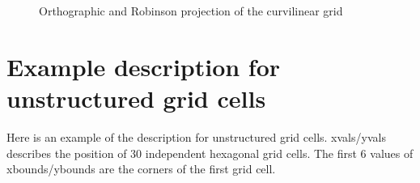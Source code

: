 \begin{figure}[b]
{}
\caption[curvgrid]{Orthographic and Robinson projection of the curvilinear grid}
\end{figure}

\newpage
\section{Example description for unstructured grid cells}
Here is an example of the \CDO description for unstructured grid cells.
xvals/yvals describes the position of 30 independent hexagonal grid cells.
The first 6 values of xbounds/ybounds are the corners of the first grid cell.
